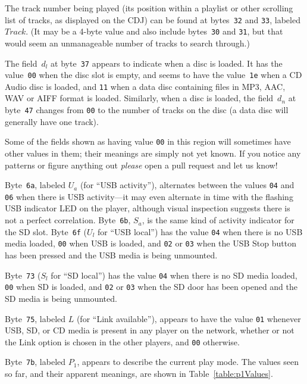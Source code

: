 \documentclass[11pt]{article}
\begin{document}
The track number being played (its position within a playlist or other
scrolling list of tracks, as displayed on the CDJ) can be found at
bytes~{\tt 32} and {\tt 33}, labeled $Track$. (It may be a 4-byte
value and also include bytes~{\tt 30} and {\tt 31}, but that would
seem an unmanageable number of tracks to search through.)

The field~$d_l$ at byte~{\tt 37} appears to indicate when a disc is
loaded. It has the value~{\tt 00} when the disc slot is empty, and
seems to have the value~{\tt 1e} when a CD Audio disc is loaded, and
{\tt 11} when a data disc containing files in MP3, AAC, WAV or AIFF
format is loaded. Similarly, when a disc is loaded, the field~$d_n$ at
byte~{\tt 47} changes from {\tt 00} to the number of tracks on the
disc (a data disc will generally have one track).

Some of the fields shown as having value {\tt 00} in this region will
sometimes have other values in them; their meanings are simply not yet
known. If you notice any patterns or figure anything out {\em please}
open a pull request and let us know!

Byte~{\tt 6a}, labeled $U_a$ (for ``USB activity''), alternates
between the values {\tt 04} and {\tt 06} when there is USB
activity---it may even alternate in time with the flashing USB
indicator LED on the player, although visual inspection suggests there
is not a perfect correlation. Byte~{\tt 6b}, $S_a$, is the same kind
of activity indicator for the SD slot. Byte~{\tt 6f} ($U_l$ for ``USB
local'') has the value {\tt 04} when there is no USB media loaded,
{\tt 00} when USB is loaded, and {\tt 02} or {\tt 03} when the USB
Stop button has been pressed and the USB media is being unmounted.

Byte~{\tt 73} ($S_l$ for ``SD local'') has the value {\tt 04} when
there is no SD media loaded, {\tt 00} when SD is loaded, and {\tt 02}
or {\tt 03} when the SD door has been opened and the SD media is being
unmounted.

Byte~{\tt 75}, labeled $L$ (for ``Link available''), appears to have
the value {\tt 01} whenever USB, SD, or CD media is present in any
player on the network, whether or not the Link option is chosen in the
other players, and {\tt 00} otherwise.

Byte~{\tt 7b}, labeled $P_1$, appears to describe the current play mode.
The values seen so far, and their apparent meanings, are shown in
Table~\ref{table:p1Values}.
\end{document}
